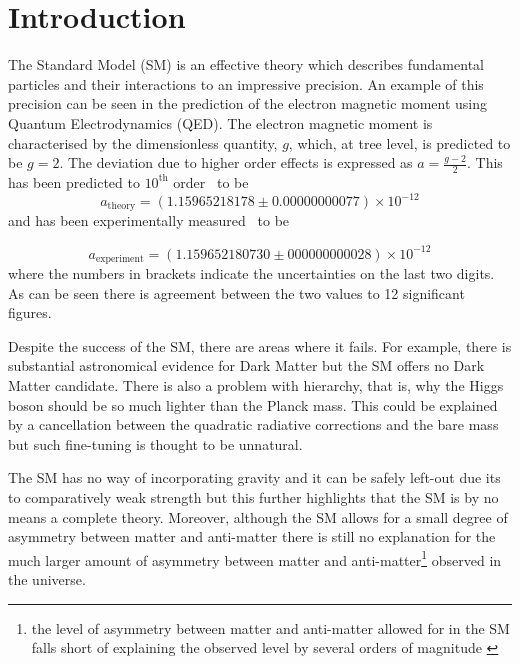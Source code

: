 
\chapter{Introduction}
The Standard Model (\Gls{SM}) is an effective theory which describes fundamental particles and their interactions to an impressive precision. An example of this precision can be seen in the prediction of the electron magnetic moment using Quantum Electrodynamics (\Gls{QED}). The electron magnetic moment is characterised by the dimensionless quantity, $g$, which, at tree level,  is predicted to be $g = 2$. The deviation due to higher order effects is expressed as $a = \frac{g - 2}{2}$.  This has been predicted to $10^{\mathrm{th}}$ order~\cite{g_2_theory} to be
\begin{equation}
  a_{\mathrm{theory}}=(1.159 652 181 78\pm 0.00000000077)\times10^{-12}
\end{equation}
and has been experimentally measured~\cite{g_2_exp} to be

\begin{equation}
  a_{\mathrm{experiment}}=(1.159652180730\pm000000000028)\times 10^{-12}
\end{equation}
where the numbers in brackets indicate the uncertainties on the last two digits. As can be seen there is agreement between the two values to 12 significant figures. %

Despite the success of the SM, there are areas where it fails. For example, there is substantial astronomical evidence for Dark Matter\cite{2010arXiv1001.0316R} but the \Gls{SM} offers no Dark Matter candidate. There is also a problem with hierarchy, that is, why the Higgs boson should be so much lighter than the Planck mass. This could be explained by a cancellation between the quadratic radiative corrections and the bare mass but such fine-tuning is thought to be unnatural. %

The SM has no way of incorporating gravity and it can be safely left-out due its to comparatively weak strength but this further highlights that the SM is by no means a complete theory. Moreover, although the SM allows for a  small degree of asymmetry between matter and anti-matter there is still no explanation for the much larger amount of asymmetry between matter and anti-matter\footnote{the level of asymmetry between matter and anti-matter allowed for in the  SM falls short of explaining the observed level by several orders of magnitude \cite{book}} observed in the universe. 

